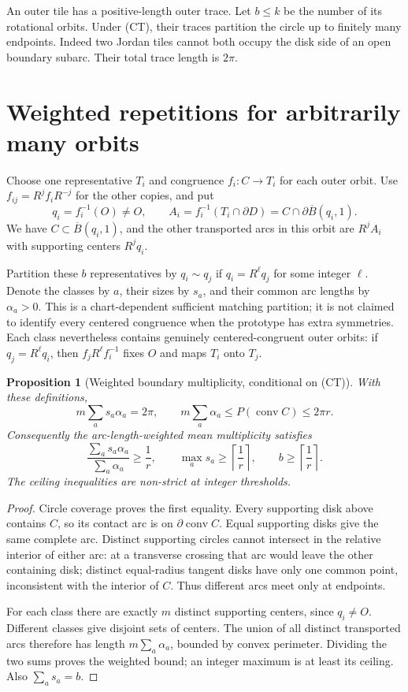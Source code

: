 \documentclass[11pt]{article}
\newtheorem{proposition}{Proposition}
\newcommand{\conv}{\operatorname{conv}}
\begin{document}
An outer tile has a positive-length outer trace. Let $b\leq k$ be the number
of its rotational orbits. Under (CT), their traces partition the circle up to
finitely many endpoints. Indeed two Jordan tiles cannot both occupy the disk
side of an open boundary subarc. Their total trace length is $2\pi$.

\section{Weighted repetitions for arbitrarily many orbits}

Choose one representative $T_i$ and congruence $f_i:C\to T_i$ for each
outer orbit. Use $f_{ij}=R^jf_iR^{-j}$ for the other copies, and put
\[
 q_i=f_i^{-1}(O)\ne O,\qquad
 A_i=f_i^{-1}(T_i\cap\partial D)
     =C\cap\partial\overline B(q_i,1).
\]
We have $C\subset\overline B(q_i,1)$, and the other transported arcs in
this orbit are $R^j A_i$ with supporting centers $R^j q_i$.

Partition these $b$ representatives by $q_i\sim q_j$ if
$q_i=R^\ell q_j$ for some integer $\ell$. Denote the classes by $a$, their
sizes by $s_a$, and their common arc lengths by $\alpha_a>0$.
This is a chart-dependent sufficient matching partition; it is not claimed
to identify every centered congruence when the prototype has extra symmetries.
Each class nevertheless contains genuinely centered-congruent outer orbits:
if $q_j=R^\ell q_i$, then $f_jR^\ell f_i^{-1}$ fixes $O$ and maps
$T_i$ onto $T_j$.

\begin{proposition}[Weighted boundary multiplicity, conditional on (CT)]
\label{prop:multiplicity}
With these definitions,
\[
 m\sum_a s_a\alpha_a=2\pi,\qquad
 m\sum_a\alpha_a\leq P(\conv C)\leq2\pi r.
\]
Consequently the arc-length-weighted mean multiplicity satisfies
\[
 \frac{\sum_a s_a\alpha_a}{\sum_a\alpha_a}\geq\frac1r,
 \qquad
 \max_a s_a\geq\left\lceil\frac1r\right\rceil,
 \qquad b\geq\left\lceil\frac1r\right\rceil.
\]
The ceiling inequalities are non-strict at integer thresholds.
\end{proposition}

\begin{proof}
Circle coverage proves the first equality. Every supporting disk above
contains $C$, so its contact arc is on $\partial\conv C$. Equal supporting
disks give the same complete arc. Distinct supporting circles cannot intersect
in the relative interior of either arc: at a transverse crossing that arc
would leave the other containing disk; distinct equal-radius tangent disks
have only one common point, inconsistent with the interior of $C$.
Thus different arcs meet only at endpoints.

For each class there are exactly $m$ distinct supporting centers, since
$q_i\ne O$. Different classes give disjoint sets of centers. The union of
all distinct transported arcs therefore has length $m\sum_a\alpha_a$,
bounded by convex perimeter. Dividing the two sums proves the weighted bound;
an integer maximum is at least its ceiling. Also $\sum_a s_a=b$.
\end{proof}
\end{document}
